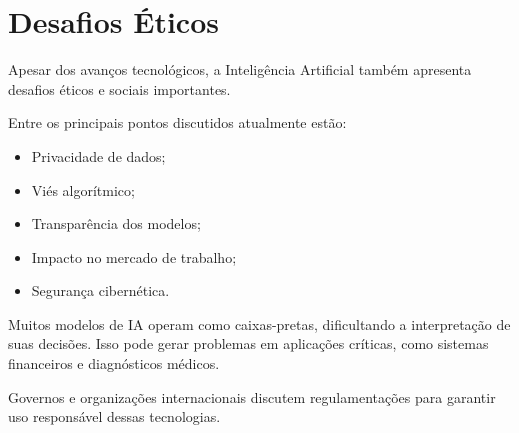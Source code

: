 \section{Desafios Éticos}

Apesar dos avanços tecnológicos, a Inteligência Artificial também apresenta desafios éticos e
sociais importantes.

Entre os principais pontos discutidos atualmente estão:

\begin{itemize}
    \item Privacidade de dados;
    \item Viés algorítmico;
    \item Transparência dos modelos;
    \item Impacto no mercado de trabalho;
    \item Segurança cibernética.
\end{itemize}

Muitos modelos de IA operam como caixas-pretas, dificultando a interpretação de suas decisões.
Isso pode gerar problemas em aplicações críticas, como sistemas financeiros e diagnósticos
médicos.

Governos e organizações internacionais discutem regulamentações para garantir uso
responsável dessas tecnologias. 